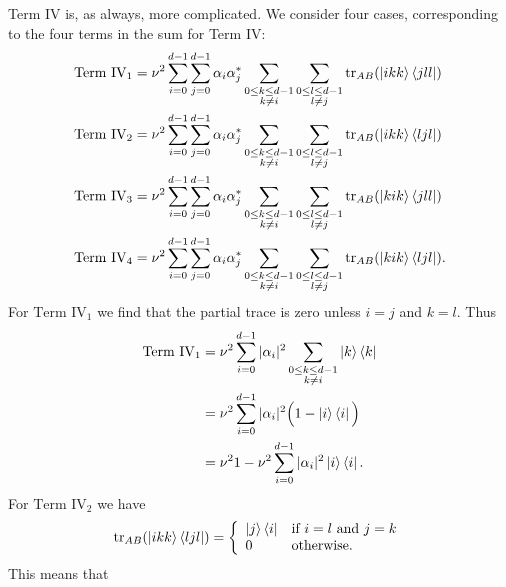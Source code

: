 \documentclass[reqno]{amsart}
\numberwithin{lemma}{section}
\numberwithin{proposition}{section}
\newcommand{\tr}{\textnormal{tr}}
\begin{document}
{\begin{remark}
Term IV is, as always, more complicated. We consider four cases, corresponding to the four terms in the sum for Term IV:
\begin{align*}
\text{Term IV}_{1} &= \nu^{2}\sum_{i=0}^{d-1} \sum_{j=0}^{d-1} \alpha_{i} \alpha_{j}^{*} \sum_{\substack{0 \leq k \leq d-1\\ k \neq i}} \sum_{\substack{0 \leq l \leq d-1\\ l \neq j}} \tr_{AB}(\ket{ikk}\bra{jll})\\
\text{Term IV}_{2} &=\nu^{2} \sum_{i=0}^{d-1} \sum_{j=0}^{d-1} \alpha_{i} \alpha_{j}^{*} \sum_{\substack{0 \leq k \leq d-1\\ k \neq i}} \sum_{\substack{0 \leq l \leq d-1\\ l \neq j}} \tr_{AB}(\ket{ikk}\bra{ljl})\\
\text{Term IV}_{3} &=\nu^{2} \sum_{i=0}^{d-1} \sum_{j=0}^{d-1} \alpha_{i} \alpha_{j}^{*} \sum_{\substack{0 \leq k \leq d-1\\ k \neq i}} \sum_{\substack{0 \leq l \leq d-1\\ l \neq j}} \tr_{AB}(\ket{kik} \bra{jll})\\
\text{Term IV}_{4} &=\nu^{2} \sum_{i=0}^{d-1} \sum_{j=0}^{d-1} \alpha_{i} \alpha_{j}^{*} \sum_{\substack{0 \leq k \leq d-1\\ k \neq i}} \sum_{\substack{0 \leq l \leq d-1\\ l \neq j}} \tr_{AB}(\ket{kik}\bra{ljl}).
\end{align*}
For $\text{Term IV}_{1}$ we find that the partial trace is zero unless $i = j$ and $k = l$. Thus
\begin{align*}
\text{Term IV}_{1} &= \nu^{2} \sum_{i=0}^{d-1} \vert \alpha_{i} \vert^{2} \sum_{\substack{0 \leq k \leq d-1\\ k \neq i}} \ket{k}\bra{k}\\
&= \nu^{2} \sum_{i=0}^{d-1} \vert \alpha_{i} \vert^{2} \Big ( 1 - \ket{i} \bra{i} \Big )\\
&= \nu^{2} 1 - \nu^{2} \sum_{i=0}^{d-1} \vert \alpha_{i} \vert^{2} \ket{i}\bra{i}.
\end{align*}
For $\text{Term IV}_{2}$ we have
\begin{equation*}
\tr_{AB}(\ket{ikk}\bra{ljl}) = \left \{ \begin{array}{ll}
\ket{j}\bra{i} & \text{if} \ i = l \ \text{and} \ j = k\\
0 & \text{otherwise}.
\end{array} 
\right .
\end{equation*}
This means that

\end{remark}}
\end{document}
